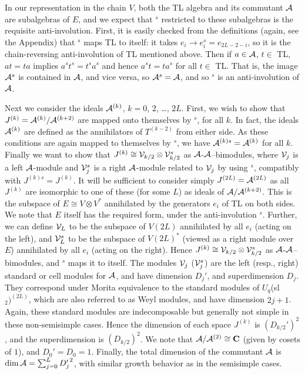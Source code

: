 \documentclass[twocolumn,floats,pra]{revtex4}
\def \cA {{\cal A}}
\begin{document}
In our representation in the chain $V$, both the TL algebra and
its commutant $\cA$ are subalgebras of $E$, and we expect that
$^s$ restricted to these subalgebras is the requisite
anti-involution. First, it is easily checked from the definitions
(again, see the Appendix) that $^s$ maps TL to itself: it takes
$e_i\to e_i^s=e_{2L-2-i}$, so it is the chain-reversing
anti-involution of TL mentioned above. Then if $a\in \cA$, $t\in$
TL, $at=ta$ implies $a^st^s=t^sa^s$ and hence $a^st=ta^s$ for all
$t\in$ TL. That is, the image $\cA^s$ is contained in $\cA$, and
vice versa, so $\cA^s=\cA$, and so $^s$ is an anti-involution of
$\cA$.

Next we consider the ideals $\cA^{(k)}$, $k=0$, $2$, \ldots, $2L$.
First, we wish to show that $J^{(k)}=\cA^{(k)}/\cA^{(k+2)}$ are
mapped onto themselves by $^s$, for all $k$. In fact, the ideals
$\cA^{(k)}$ are defined as the annihilators of $T^{(k-2)}$ from
either side. As these conditions are again mapped to themselves by
$^s$, we have $\cA^{(k)s} =\cA^{(k)}$ for all $k$. Finally we want
to show that $J^{(k)}\cong {\cal V}_{k/2}\otimes {\cal V}_{k/2}^s$
as $\cA$-$\cA$--bimodules, where ${\cal V}_j$ is a left
$\cA$-module and ${\cal V}_j^s$ is a right $\cA$-module related to
${\cal V}_j$ by using $^s$, compatibly with $J^{(k)s}=J^{(k)}$. It
will be sufficient to consider simply $J^{(2L)}=\cA^{(2L)}$ as all
$J^{(k)}$ are isomorphic to one of these (for some $L$) as ideals
of $\cA/\cA^{(k+2)}$. This is the subspace of $E\cong V\otimes
V^*$ annihilated by the generators $e_i$ of TL on both sides. We
note that $E$ itself has the required form, under the
anti-involution $^s$. Further, we can define ${\cal V}_L$ to be
the subspace of $V(2L)$ annihilated by all $e_i$ (acting on the
left), and ${\cal V}_L^s$ to be the subspace of $V(2L)^*$ (viewed
as a right module over $E$) annihilated by all $e_i$ (acting on
the right). Hence $J^{(k)}\cong {\cal V}_{k/2}\otimes {\cal
V}_{k/2}^s$ as $\cA$-$\cA$--bimodules, and $^s$ maps it to itself.
The modules ${\cal V}_j$ (${\cal V}_j^s$) are the left (resp.,
right) standard or cell modules for $\cA$, and have dimension
$D_j'$, and superdimension $D_j$. They correspond under Morita
equivalence to the standard modules of $U_q$(sl$_2)^{(2L)}$, which
are also referred to as Weyl modules, and have dimension $2j+1$.
Again, these standard modules are indecomposable but generally not
simple in these non-semisimple cases. Hence the dimension of each
space $J^{(k)}$ is $(D_{k/2}')^2$, and the superdimension is
$(D_{k/2})^2$. We note that $\cA/\cA^{(2)}\cong {\bf C}$ (given by
cosets of $1$), and $D_0'=D_0=1$. Finally, the total dimension of
the commutant $\cA$ is ${\rm dim}\,\cA=\sum_{j=0}^L {D_j'}^2$,
with similar growth behavior as in the semisimple cases.
\end{document}
